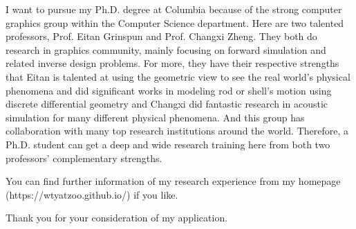 \documentclass[a4paper,12pt]{article}
\begin{document}
I want to pursue my Ph.D. degree at Columbia because of the strong computer graphics group within the Computer Science department. Here are two talented professors, Prof. Eitan Grinspun and Prof. Changxi Zheng. They both do research in graphics community, mainly focusing on forward simulation and related inverse design problems. For more, they have their respective strengths that Eitan is talented at using the geometric view to see the real world's physical phenomena and did significant works in modeling rod or shell's motion using discrete differential geometry and Changxi did fantastic research in acoustic simulation for many different physical phenomena. And this group has collaboration with many top research institutions around the world. Therefore, a Ph.D. student can get a deep and wide research training here from both two professors' complementary strengths.\vspace{1.2ex} 

You can find further information of my research experience from my homepage\\(https://wtyatzoo.github.io/) if you like.\vspace{1.2ex}

Thank you for your consideration of my application.

\vspace{1.2ex}
\end{document}
